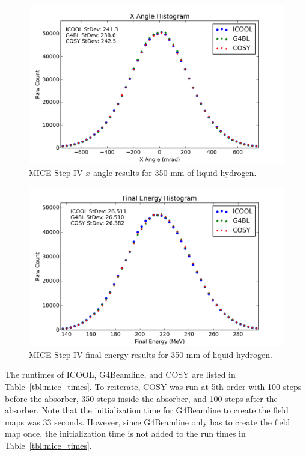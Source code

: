 \begin{figure}[H]
  \centering
    \includegraphics[width=\textwidth]{MICE data/px} 
  \caption{MICE Step IV $x$ angle results for 350 mm of liquid hydrogen.}
  \label{fig:micexangle}
\end{figure}

\begin{figure}[H]
  \centering
    \includegraphics[width=\textwidth]{MICE data/e} 
  \caption{MICE Step IV final energy results for 350 mm of liquid hydrogen.}
  \label{fig:miceenergy}
\end{figure}

The runtimes of ICOOL, G4Beamline, and COSY are listed in Table~\ref{tbl:mice_times}. To reiterate, COSY was run at 5th order with 100 steps before the absorber, 350 steps inside the absorber, and 100 steps after the absorber. Note that the initialization time for G4Beamline to create the field maps was 33 seconds. However, since G4Beamline only has to create the field map once, the initialization time is not added to the run times in Table~\ref{tbl:mice_times}.

